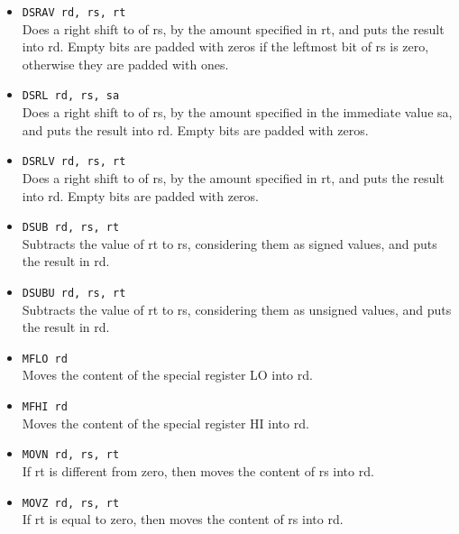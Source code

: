 \documentclass[12pt]{report}
\begin{document}
\begin{itemize}
	\item \texttt{DSRAV rd, rs, rt}\\
	Does a right shift to of rs, by the amount specified in rt, and puts the
	result into rd. Empty bits are padded with zeros if the leftmost bit of rs
	is zero, otherwise they are padded with ones.

	\item \texttt{DSRL rd, rs, sa}\\
	Does a right shift to of rs, by the amount specified in the immediate value
	sa, and puts the result into rd. Empty bits are padded with zeros.
	
	\item \texttt{DSRLV rd, rs, rt}\\
	Does a right shift to of rs, by the amount specified in rt, and puts the
	result into rd. Empty bits are padded with zeros.

	\item \texttt{DSUB rd, rs, rt}\\
	Subtracts the value of rt to rs, considering them as signed values, and
	puts the result in rd.

	\item \texttt{DSUBU rd, rs, rt}\\
	Subtracts the value of rt to rs, considering them as unsigned values, and
	puts the result in rd.

	\item \texttt{MFLO rd}\\
	Moves the content of the special register LO into rd.

	\item \texttt{MFHI rd}\\
	Moves the content of the special register HI into rd.

	\item \texttt{MOVN rd, rs, rt}\\
	If rt is different from zero, then moves the content of rs into rd.

	\item \texttt{MOVZ rd, rs, rt}\\
	If rt is equal to zero, then moves the content of rs into rd.


\end{itemize}
\end{document}
